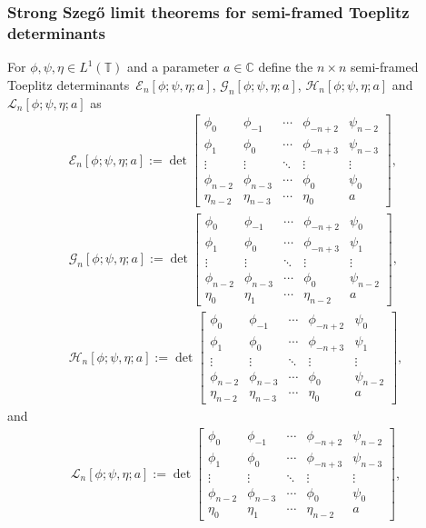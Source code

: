 \documentclass[10pt,a4paper]{amsart}
\numberwithin{equation}{section}
\newcommand{\C}{{\mathbb C}}
\newcommand{\T}{{\mathbb T}}
\begin{document}
	\subsubsection{Strong Szeg\H{o} limit theorems for semi-framed Toeplitz determinants}	
	For $\phi,\psi,\eta \in L^1(\T)$ and a parameter $a \in \C$ define the $n\times n$ semi-framed Toeplitz determinants~${\mathscr{E}_n[\phi;\psi,\eta;a]}$, $\mathscr{G}_n[\phi;\psi,\eta;a]$, $\mathscr{H}_n[\phi;\psi,\eta;a]$ and $\mathscr{L}_n[\phi;\psi,\eta;a]$ as
	\begin{gather*}%
		\mathscr{E}_n[\phi;\psi,\eta;a] := \det \begin{bmatrix}
			\phi_0& \phi_{-1} & \cdots & \phi_{-n+2} & \psi_{n-2} \\
			\phi_{1}& \phi_0 & \cdots & \phi_{-n+3} & \psi_{n-3} \\
			\vdots & \vdots & \ddots & \vdots & \vdots \\
			\phi_{n-2} & \phi_{n-3} & \cdots & \phi_{0} & \psi_{0} \\
			\eta_{n-2} & \eta_{n-3} & \cdots & \eta_{0} & a
		\end{bmatrix},
\\
		\mathscr{G}_n[\phi;\psi,\eta;a] := \det \begin{bmatrix}
			\phi_0& \phi_{-1} & \cdots & \phi_{-n+2} & \psi_{0} \\
			\phi_{1}& \phi_0 & \cdots & \phi_{-n+3} & \psi_{1} \\
			\vdots & \vdots & \ddots & \vdots & \vdots \\
			\phi_{n-2} & \phi_{n-3} & \cdots & \phi_{0} & \psi_{n-2} \\
			\eta_{0} & \eta_{1} & \cdots & \eta_{n-2} & a
		\end{bmatrix},
\\
		\mathscr{H}_n[\phi;\psi,\eta;a] := \det \begin{bmatrix}
			\phi_0& \phi_{-1} & \cdots & \phi_{-n+2} & \psi_{0} \\
			\phi_{1}& \phi_0 & \cdots & \phi_{-n+3} & \psi_{1} \\
			\vdots & \vdots & \ddots & \vdots & \vdots \\
			\phi_{n-2} & \phi_{n-3} & \cdots & \phi_{0} & \psi_{n-2} \\
			\eta_{n-2} & \eta_{n-3} & \cdots & \eta_{0} & a
		\end{bmatrix},
	\end{gather*}
	and
	\begin{gather*}%
		\mathscr{L}_n[\phi;\psi,\eta;a] := \det \begin{bmatrix}
			\phi_0& \phi_{-1} & \cdots & \phi_{-n+2} & \psi_{n-2} \\
			\phi_{1}& \phi_0 & \cdots & \phi_{-n+3} & \psi_{n-3} \\
			\vdots & \vdots & \ddots & \vdots & \vdots \\
			\phi_{n-2} & \phi_{n-3} & \cdots & \phi_{0} & \psi_{0} \\
			\eta_{0} & \eta_{1} & \cdots & \eta_{n-2} & a
		\end{bmatrix},
	\end{gather*}
\end{document}
